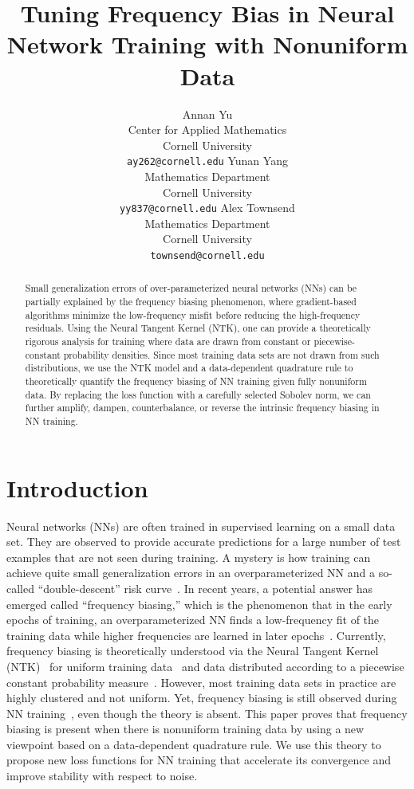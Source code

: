\documentclass{article} %
\title{Tuning Frequency Bias in Neural Network Training with Nonuniform Data}
\author{Annan Yu \\
Center for Applied Mathematics \\ 
Cornell University \\
\texttt{ay262@cornell.edu}
\And
Yunan Yang\\
Mathematics Department\\ 
Cornell University \\
\texttt{yy837@cornell.edu}
\And 
Alex Townsend\\
Mathematics Department\\ 
Cornell University \\
\texttt{townsend@cornell.edu}
}
\begin{document}
\maketitle


\begin{abstract}
Small generalization errors of over-parameterized neural networks (NNs) can be partially explained by the frequency biasing phenomenon, where gradient-based algorithms minimize the low-frequency misfit before reducing the high-frequency residuals. Using the Neural Tangent Kernel (NTK), one can provide a theoretically rigorous analysis for training where data are drawn from constant or piecewise-constant probability densities. Since most training data sets are not drawn from such distributions, we use the NTK model and a data-dependent quadrature rule to theoretically quantify the frequency biasing of NN training given fully nonuniform data. By replacing the loss function with a carefully selected Sobolev norm, we can further amplify, dampen, counterbalance, or reverse the intrinsic frequency biasing in NN training.
\end{abstract}

\section{Introduction}
Neural networks (NNs) are often trained in supervised learning on a small data set. They are observed to provide accurate predictions for a large number of test examples that are not seen during training. A mystery is how training can achieve quite small generalization errors in an overparameterized NN and a so-called ``double-descent'' risk curve~\citep{belkin2019reconciling}. In recent years, a potential answer has emerged called ``frequency biasing,'' which is the phenomenon that in the early epochs of training, an overparameterized NN finds a low-frequency fit of the training data while higher frequencies are learned in later epochs~\citep{rahaman2019spectral,yang2019fine,xu2020frequency}. Currently, frequency biasing is theoretically understood via the Neural Tangent Kernel (NTK)~\citep{jacot2018neural} for uniform  training data~\citep{arora,cao2019towards,basri} and data distributed according to a piecewise constant probability measure~\citep{basri2020frequency}. However, most training data sets in practice are highly clustered and not uniform. Yet, frequency biasing is still observed during NN training~\citep{fridovich2021spectral}, even though the theory is absent.  This paper proves that frequency biasing is present when there is nonuniform training data by using a new viewpoint based on a data-dependent quadrature rule. We use this theory to propose new loss functions for NN training that accelerate its convergence and improve stability with respect to noise. 
\end{document}
